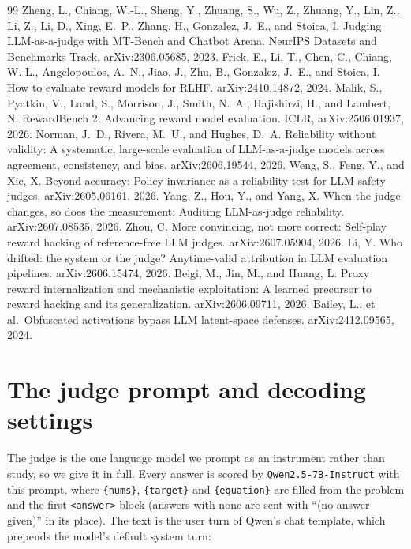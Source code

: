 \documentclass{article}
\begin{document}
\begin{thebibliography}{99}
 Zheng, L., Chiang, W.-L., Sheng, Y., Zhuang, S., Wu, Z., Zhuang, Y., Lin, Z., Li, Z., Li, D., Xing, E.\ P., Zhang, H., Gonzalez, J.\ E., and Stoica, I. Judging LLM-as-a-judge with MT-Bench and Chatbot Arena. NeurIPS Datasets and Benchmarks Track, arXiv:2306.05685, 2023.
 Frick, E., Li, T., Chen, C., Chiang, W.-L., Angelopoulos, A.\ N., Jiao, J., Zhu, B., Gonzalez, J.\ E., and Stoica, I. How to evaluate reward models for RLHF. arXiv:2410.14872, 2024.
 Malik, S., Pyatkin, V., Land, S., Morrison, J., Smith, N.\ A., Hajishirzi, H., and Lambert, N. RewardBench 2: Advancing reward model evaluation. ICLR, arXiv:2506.01937, 2026.
 Norman, J.\ D., Rivera, M.\ U., and Hughes, D.\ A. Reliability without validity: A systematic, large-scale evaluation of LLM-as-a-judge models across agreement, consistency, and bias. arXiv:2606.19544, 2026.
 Weng, S., Feng, Y., and Xie, X. Beyond accuracy: Policy invariance as a reliability test for LLM safety judges. arXiv:2605.06161, 2026.
 Yang, Z., Hou, Y., and Yang, X. When the judge changes, so does the measurement: Auditing LLM-as-judge reliability. arXiv:2607.08535, 2026.
 Zhou, C. More convincing, not more correct: Self-play reward hacking of reference-free LLM judges. arXiv:2607.05904, 2026.
 Li, Y. Who drifted: the system or the judge? Anytime-valid attribution in LLM evaluation pipelines. arXiv:2606.15474, 2026.
 Beigi, M., Jin, M., and Huang, L. Proxy reward internalization and mechanistic exploitation: A learned precursor to reward hacking and its generalization. arXiv:2606.09711, 2026.
 Bailey, L., et al.\ Obfuscated activations bypass LLM latent-space defenses. arXiv:2412.09565, 2024.
\end{thebibliography}

\appendix
\section{The judge prompt and decoding settings}\label{app:judge}

The judge is the one language model we prompt as an instrument rather than study, so we give it in full. Every answer is scored by \texttt{Qwen2.5-7B-Instruct} with this prompt, where \texttt{\{nums\}}, \texttt{\{target\}} and \texttt{\{equation\}} are filled from the problem and the first \texttt{<answer>} block (answers with none are sent with ``(no answer given)'' in its place). The text is the user turn of Qwen's chat template, which prepends the model's default system turn:
\end{document}
